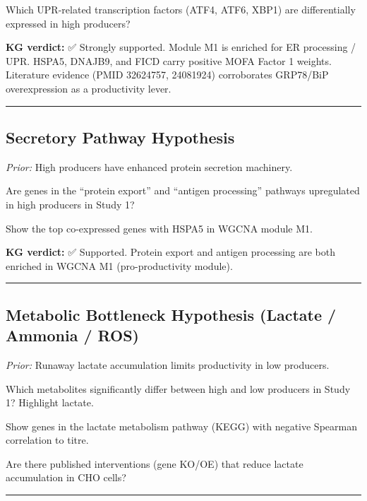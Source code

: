 \documentclass[
  letterpaper,
  oneside,
  open=any]{scrbook}
\begin{document}
Which UPR-related transcription factors (ATF4, ATF6, XBP1) are
differentially expressed in high producers?

\textbf{KG verdict:} ✅ Strongly supported. Module M1 is enriched for ER
processing / UPR. HSPA5, DNAJB9, and FICD carry positive MOFA Factor 1
weights. Literature evidence (PMID 32624757, 24081924) corroborates
GRP78/BiP overexpression as a productivity lever.

\begin{center}\rule{0.5\linewidth}{0.5pt}\end{center}

\subsection{Secretory Pathway
Hypothesis}\label{secretory-pathway-hypothesis}

\emph{Prior:} High producers have enhanced protein secretion machinery.

Are genes in the ``protein export'' and ``antigen processing'' pathways
upregulated in high producers in Study 1?

Show the top co-expressed genes with HSPA5 in WGCNA module M1.

\textbf{KG verdict:} ✅ Supported. Protein export and antigen processing
are both enriched in WGCNA M1 (pro-productivity module).

\begin{center}\rule{0.5\linewidth}{0.5pt}\end{center}

\subsection{Metabolic Bottleneck Hypothesis (Lactate / Ammonia /
ROS)}\label{metabolic-bottleneck-hypothesis-lactate-ammonia-ros}

\emph{Prior:} Runaway lactate accumulation limits productivity in low
producers.

Which metabolites significantly differ between high and low producers in
Study 1? Highlight lactate.

Show genes in the lactate metabolism pathway (KEGG) with negative
Spearman correlation to titre.

Are there published interventions (gene KO/OE) that reduce lactate
accumulation in CHO cells?

\begin{center}\rule{0.5\linewidth}{0.5pt}\end{center}
\end{document}
